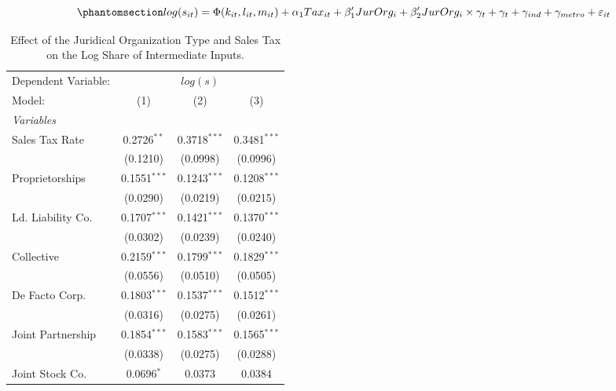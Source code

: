 \documentclass[
  12pt]{article}
\theoremstyle{definition}
\theoremstyle{remark}
\begin{document}
\begin{equation}\phantomsection\label{eq-reg-tax-jo}{
log(s_{it})= \Phi(k_{it},l_{it},m_{it})+ \alpha_1Tax_{it}+\mathbf{\beta}_1'JurOrg_i + \beta_2'JurOrg_i\times\gamma_t+ \gamma_t + \gamma_{ind} +\gamma_{metro} + \varepsilon_{it}
}\end{equation}

\begin{table}

\caption{\label{tbl-reg-jo-tax}Effect of the Juridical Organization Type
and Sales Tax on the Log Share of Intermediate Inputs.}

\begin{minipage}{\linewidth}

\begingroup
\centering
\begin{tabular}{lccc}
   \tabularnewline \midrule \midrule
   Dependent Variable: & \multicolumn{3}{c}{\(log(s)\)}\\
   Model:            & (1)            & (2)             & (3)\\  
   \midrule
   \emph{Variables}\\
   Sales Tax Rate    & 0.2726$^{**}$  & 0.3718$^{***}$  & 0.3481$^{***}$\\   
                     & (0.1210)       & (0.0998)        & (0.0996)\\   
   Proprietorships   & 0.1551$^{***}$ & 0.1243$^{***}$  & 0.1208$^{***}$\\   
                     & (0.0290)       & (0.0219)        & (0.0215)\\   
   Ld. Liability Co. & 0.1707$^{***}$ & 0.1421$^{***}$  & 0.1370$^{***}$\\   
                     & (0.0302)       & (0.0239)        & (0.0240)\\   
   Collective        & 0.2159$^{***}$ & 0.1799$^{***}$  & 0.1829$^{***}$\\   
                     & (0.0556)       & (0.0510)        & (0.0505)\\   
   De Facto Corp.    & 0.1803$^{***}$ & 0.1537$^{***}$  & 0.1512$^{***}$\\   
                     & (0.0316)       & (0.0275)        & (0.0261)\\   
   Joint Partnership & 0.1854$^{***}$ & 0.1583$^{***}$  & 0.1565$^{***}$\\   
                     & (0.0338)       & (0.0275)        & (0.0288)\\   
   Joint Stock Co.   & 0.0696$^{*}$   & 0.0373          & 0.0384\\   

\end{tabular}
\end{minipage}
\end{table}
\end{document}
